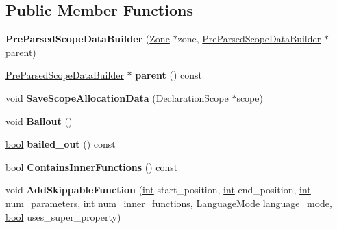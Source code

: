 \subsection*{Public Member Functions}
\begin{DoxyCompactItemize}
\item 
\mbox{\label{classv8_1_1internal_1_1PreParsedScopeDataBuilder_a657a3dd84dced821700ec3d18e370b1b}} 
{\bfseries Pre\+Parsed\+Scope\+Data\+Builder} (\mbox{\hyperlink{classv8_1_1internal_1_1Zone}{Zone}} $\ast$zone, \mbox{\hyperlink{classv8_1_1internal_1_1PreParsedScopeDataBuilder}{Pre\+Parsed\+Scope\+Data\+Builder}} $\ast$parent)
\item 
\mbox{\label{classv8_1_1internal_1_1PreParsedScopeDataBuilder_ab621c81c46991598f08ba680b6d26e94}} 
\mbox{\hyperlink{classv8_1_1internal_1_1PreParsedScopeDataBuilder}{Pre\+Parsed\+Scope\+Data\+Builder}} $\ast$ {\bfseries parent} () const
\item 
\mbox{\label{classv8_1_1internal_1_1PreParsedScopeDataBuilder_ae38622f4dc10a3d9fa7390fd67cc272a}} 
void {\bfseries Save\+Scope\+Allocation\+Data} (\mbox{\hyperlink{classv8_1_1internal_1_1DeclarationScope}{Declaration\+Scope}} $\ast$scope)
\item 
\mbox{\label{classv8_1_1internal_1_1PreParsedScopeDataBuilder_aad2ea67d9bd4b053d7b1efe02d736ef1}} 
void {\bfseries Bailout} ()
\item 
\mbox{\label{classv8_1_1internal_1_1PreParsedScopeDataBuilder_a2256f65f82525ee9a6273aa2d5455827}} 
\mbox{\hyperlink{classbool}{bool}} {\bfseries bailed\+\_\+out} () const
\item 
\mbox{\label{classv8_1_1internal_1_1PreParsedScopeDataBuilder_a6f8ac669e0348ddd76f192a3b6ff9444}} 
\mbox{\hyperlink{classbool}{bool}} {\bfseries Contains\+Inner\+Functions} () const
\item 
\mbox{\label{classv8_1_1internal_1_1PreParsedScopeDataBuilder_a478c8a68576ea59f647860f5c24b7833}} 
void {\bfseries Add\+Skippable\+Function} (\mbox{\hyperlink{classint}{int}} start\+\_\+position, \mbox{\hyperlink{classint}{int}} end\+\_\+position, \mbox{\hyperlink{classint}{int}} num\+\_\+parameters, \mbox{\hyperlink{classint}{int}} num\+\_\+inner\+\_\+functions, Language\+Mode language\+\_\+mode, \mbox{\hyperlink{classbool}{bool}} uses\+\_\+super\+\_\+property)
\end{DoxyCompactItemize}
